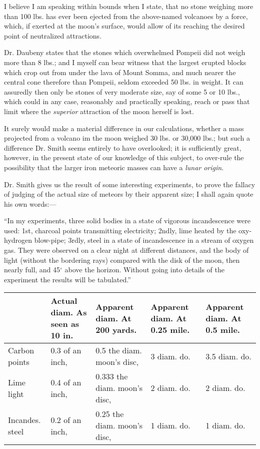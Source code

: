 \documentclass[a4paper, 12pt, oneside]{article}
\begin{document}
I believe I am speaking within bounds when I state, that no stone weighing more than 100 lbs. has ever been ejected from the above-named volcanoes by a force, which, if exerted at the moon's surface, would allow of its reaching the desired point of neutralized attractions.

Dr. Daubeny states that the stones which overwhelmed Pompeii did not weigh more than 8 lbs.; and I myself can bear witness that the largest erupted blocks which crop out from under the lava of Mount Somma, and much nearer the central cone therefore than Pompeii, seldom exceeded 50 lbs. in weight. It can assuredly then only be stones of very moderate size, say of some 5 or 10 lbs., which could in any case, reasonably and practically speaking, reach or pass that limit where the \emph{superior} attraction of the moon herself is lost.

It surely would make a material difference in our calculations, whether a mass projected from a volcano im the moon weighed 30 lbs. or 30,000 lbs.; but such a difference Dr. Smith seems entirely to have overlooked; it is sufficiently great, however, in the present state of our knowledge of this subject, to over-rule the possibility that the larger iron meteoric masses can have a \emph{lunar origin}.

Dr. Smith gives us the result of some interesting experiments, to prove the fallacy of judging of the actual size of meteors by their apparent size; I shall again quote his own words:---

``In my experiments, three solid bodies in a state of vigorous incandescence were used: 1st, charcoal points transmitting electricity; 2ndly, lime heated by the oxy-hydrogen blow-pipe; 3rdly, steel in a state of incandescence in a stream of oxygen gas. They were observed on a clear night at different distances, and the body of light (without the bordering rays) compared with the disk of the moon, then nearly full, and 45$^\circ$ above the horizon. Without going into details of the experiment the results will be tabulated.''
\begin{table}[H]
    \footnotesize
    \centering
    \Fontauri
    \begin{tabular}{l p{20mm} p{20mm} p{20mm} p{20mm}}
         ~ & Actual diam. As seen as 10 in. & Apparent diam. At 200 yards. & Apparent diam. At 0.25 mile. & Apparent diam. At 0.5 mile. \\ \hline
        Carbon points & 0.3 of an inch, & 0.5 the diam. moon’s disc, & 3 diam. do. & 3.5 diam. do. \\ 
        Lime light & 0.4 of an inch, & 0.333 the diam. moon’s disc, & 2 diam. do. & 2 diam. do. \\ 
        Incandes. steel & 0.2 of an inch, & 0.25 the diam. moon’s disc, & 1 diam. do. & 1 diam. do. \\
    \end{tabular}
\end{table}
\end{document}

